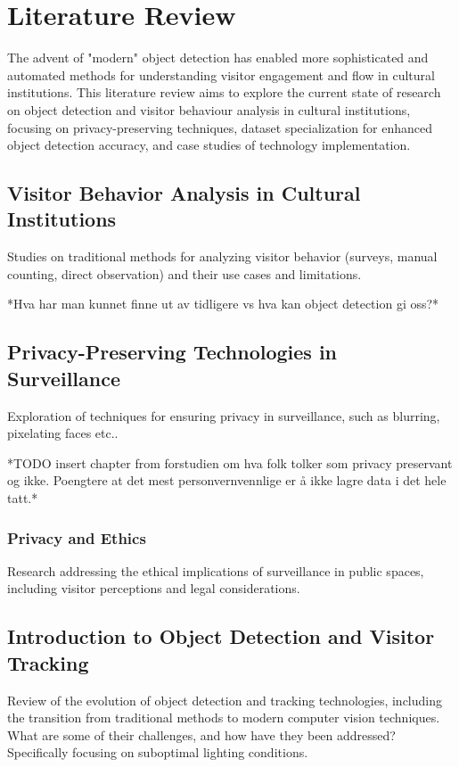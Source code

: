 \section{Literature Review}
The advent of "modern" object detection has enabled more sophisticated and automated methods for understanding visitor engagement and flow in cultural institutions. This literature review aims to explore the current state of research on object detection and visitor behaviour analysis in cultural institutions, focusing on privacy-preserving techniques, dataset specialization for enhanced object detection accuracy, and case studies of technology implementation. 

\subsection{Visitor Behavior Analysis in Cultural Institutions}
Studies on traditional methods for analyzing visitor behavior (surveys, manual counting, direct observation) and their use cases and limitations.

*Hva har man kunnet finne ut av tidligere vs hva kan object detection gi oss?*

\subsection{Privacy-Preserving Technologies in Surveillance}
Exploration of techniques for ensuring privacy in surveillance, such as blurring, pixelating faces etc.. 

*TODO insert chapter from forstudien om hva folk tolker som privacy preservant og ikke. Poengtere at det mest personvernvennlige er å ikke lagre data i det hele tatt.*

\subsubsection{Privacy and Ethics}
Research addressing the ethical implications of surveillance in public spaces, including visitor perceptions and legal considerations.

\subsection{Introduction to Object Detection and Visitor Tracking}
Review of the evolution of object detection and tracking technologies, including the transition from traditional methods to modern computer vision techniques. What are some of their challenges, and how have they been addressed? Specifically focusing on suboptimal lighting conditions.

